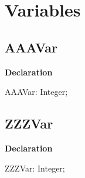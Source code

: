 \documentclass{report}
\begin{document}
\section{Variables}
\subsection*{AAAVar}
\begin{list}{}{
\setlength{\itemindent}{0cm}
\setlength{\listparindent}{0cm}
\setlength{\leftmargin}{\evensidemargin}
\addtolength{\leftmargin}{\tmplength}
\settowidth{\labelsep}{X}
\addtolength{\leftmargin}{\labelsep}
\setlength{\labelwidth}{\tmplength}
}
\begin{flushleft}
\item[\textbf{Declaration}\hfill]
\begin{ttfamily}
AAAVar: Integer;\end{ttfamily}


\end{flushleft}
\end{list}
\subsection*{ZZZVar}
\begin{list}{}{
\setlength{\itemindent}{0cm}
\setlength{\listparindent}{0cm}
\setlength{\leftmargin}{\evensidemargin}
\addtolength{\leftmargin}{\tmplength}
\settowidth{\labelsep}{X}
\addtolength{\leftmargin}{\labelsep}
\setlength{\labelwidth}{\tmplength}
}
\begin{flushleft}
\item[\textbf{Declaration}\hfill]
\begin{ttfamily}
ZZZVar: Integer;\end{ttfamily}


\end{flushleft}
\end{list}
\end{document}
